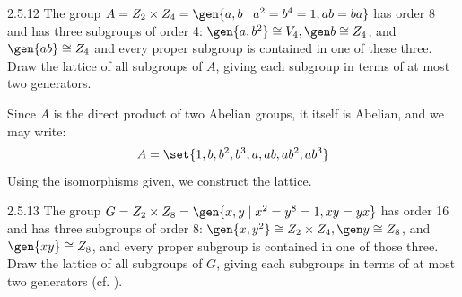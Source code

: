 \begin{exercise}{2.5.12} 
    The group $A = Z_2 \times Z_4 = \gen{a, b \mid a^2 = b^4 = 1, ab = ba}$ has order 8 and has three subgroups of order 4: $\gen{a, b^2} \cong V_4, \gen b \cong Z_4$, and $\gen{ab} \cong Z_4$ and every proper subgroup is contained in one of these three.
	Draw the lattice of all subgroups of $A$, giving each subgroup in terms of at most two generators.
\end{exercise}

\begin{sol}
    Since $A$ is the direct product of two Abelian groups, it itself is Abelian, and we may write:
    \[
    	A = \set{1, b, b^2, b^3, a, ab, ab^2, ab^3}
    \]
    Using the isomorphisms given, we construct the lattice.
    \begin{center}
    \end{center}
\end{sol}

\begin{exercise}{2.5.13}
    The group $G = Z_2 \times Z_8 = \gen{x, y \mid x^2 = y^8 = 1, xy = yx}$ has order 16 and has three subgroups of order 8: $\gen{x, y^2} \cong Z_2 \times Z_4, \gen y \cong Z_8$, and $\gen{xy} \cong Z_8$, and every proper subgroup is contained in one of those three.
	Draw the lattice of all subgroups of $G$, giving each subgroups in terms of at most two generators (cf. ).
\end{exercise}

